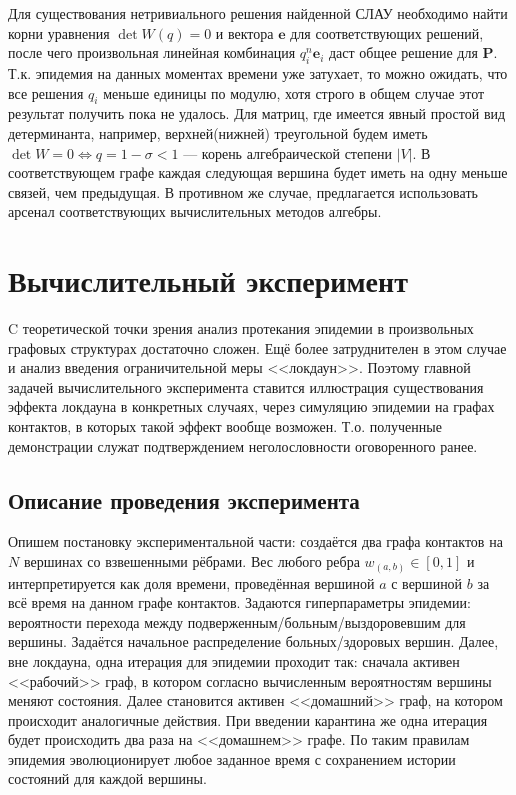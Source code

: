 	 Для существования нетривиального решения найденной СЛАУ необходимо найти корни уравнения $\det W(q) = 0$ и вектора $\mathbf{e}$ для соответствующих решений, после чего произвольная линейная комбинация $q_i^n \mathbf{e}_i$ даст общее решение для $\mathbf{P}$. Т.к. эпидемия на данных моментах времени уже затухает, то можно ожидать, что все решения $q_i$ меньше единицы по модулю, хотя строго в общем случае этот результат получить пока не удалось. Для матриц, где имеется явный простой вид детерминанта, например, верхней(нижней) треугольной будем иметь $\det W = 0 \Leftrightarrow q = 1 - \sigma < 1$ --- корень алгебраической степени $|V|$. В соответствующем графе каждая следующая вершина будет иметь на одну меньше связей, чем предыдущая. В противном же случае, предлагается использовать арсенал соответствующих вычислительных методов алгебры.
	
	\section*{Вычислительный эксперимент}
	
	C теоретической точки зрения анализ протекания эпидемии в произвольных графовых структурах достаточно сложен. Ещё более затруднителен в этом случае и анализ введения ограничительной меры <<локдаун>>. Поэтому главной задачей вычислительного эксперимента ставится иллюстрация существования эффекта локдауна в конкретных случаях, через симуляцию эпидемии на графах контактов, в которых такой эффект вообще возможен. Т.о. полученные демонстрации служат подтверждением неголословности оговоренного ранее.
	
	\subsection*{Описание проведения эксперимента}
	
	Опишем постановку экспериментальной части: создаётся два графа контактов на $ N $ вершинах со взвешенными рёбрами. Вес любого ребра $ w_{(a, b)} \in [0, 1] $ и интерпретируется как доля времени, проведённая вершиной $ a $ с вершиной $ b $ за всё время на данном графе контактов. Задаются гиперпараметры эпидемии: вероятности перехода между подверженным/больным/выздоровевшим для вершины. Задаётся начальное распределение больных/здоровых вершин. Далее, вне локдауна, одна итерация для эпидемии проходит так: сначала активен <<рабочий>> граф, в котором согласно вычисленным вероятностям вершины меняют состояния. Далее становится активен <<домашний>> граф, на котором происходит аналогичные действия. При введении карантина же одна итерация будет происходить два раза на <<домашнем>> графе. По таким правилам эпидемия эволюционирует любое заданное время с сохранением истории состояний для каждой вершины.
	
